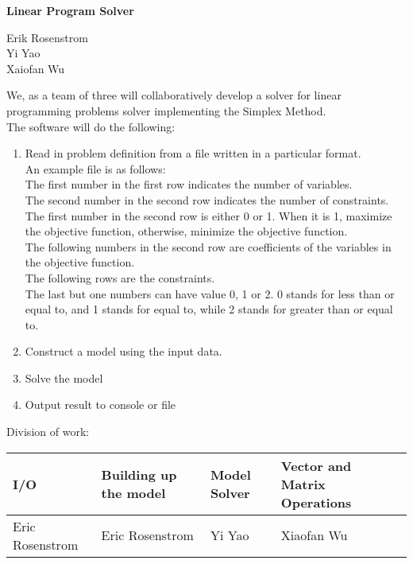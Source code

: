 \documentclass{article}
\begin{document}
	\begin{center}
		\begin{LARGE}
			\textbf{Linear Program Solver}\\
		\end{LARGE}
		Erik Rosenstrom\\
		Yi Yao\\
		Xaiofan Wu\\
	\end{center}
	We, as a team of three will collaboratively develop a solver for linear programming problems solver implementing the Simplex Method.\\
	The software will do the following:\\
	\begin{enumerate}
		\item 
		Read in problem definition from a file written in a particular format.\\
		An example file is as follows:\\
		
		The first number in the first row indicates the number of variables.\\
		The second number in the second row indicates the number of constraints.\\
		The first number in the second row is either 0 or 1. When it is 1, maximize the objective function, otherwise, minimize the objective function.\\
		The following numbers in the second row are coefficients of the variables in the objective function.\\
		The following rows are the constraints.\\
		The last but one numbers can have value 0, 1 or 2. 0 stands for less than or equal to, and 1 stands for equal to, while 2 stands for greater than or equal to.
		\item 
		Construct a model using the input data.
		\item 
		Solve the model
		\item 
		Output result to console or file
	\end{enumerate}
	Division of work:\\
	\begin{tabular}{|l|l|l|l|}
		\hline
		I/O &Building up the model &Model Solver &Vector and Matrix Operations\\
		\hline
		Eric Rosenstrom &Eric Rosenstrom &Yi Yao &Xiaofan Wu\\
		\hline
	\end{tabular}
\end{document}
